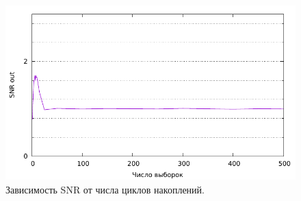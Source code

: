 \documentclass[12pt, a4paper] {ncc}
\begin{document}
        \begin{figure}[H]
            \centering
            \includegraphics[scale=0.9,page=1]{nonstat_by_m.pdf}
            \caption{Зависимость SNR от числа циклов накоплений.}
        \end{figure}
\end{document}
